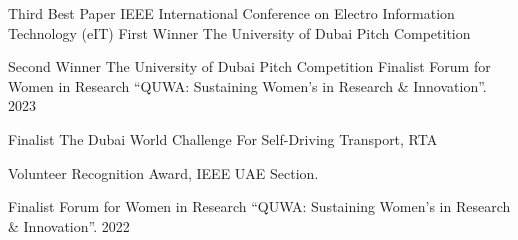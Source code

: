 
\begin{cvhonors}


  \cvhonor
    {Third Best Paper} %
    {IEEE International Conference on Electro Information Technology (eIT)} %
    {} %
    {} %
    \cvhonor
    {First Winner} %
    {The University of Dubai Pitch Competition} %
    {} %
    {} %

    \cvhonor
      {Second Winner} %
    {The University of Dubai Pitch Competition} %
    {} %
    {} %
  \cvhonor
    {Finalist} %
    {Forum for Women in
Research “QUWA: Sustaining Women’s in Research \& Innovation”. } %
    {} %
    {2023} %

  \cvhonor
    {Finalist} %
    {The Dubai World Challenge For Self-Driving Transport, RTA} %
    {} %
    {} %


     \cvhonor
    {Volunteer Recognition Award,} %
    {IEEE UAE Section. } %
    {} %
    {} %



\end{cvhonors}

\begin{cvhonors}

    \cvhonor
    {Finalist} %
    {Forum for Women in
Research “QUWA: Sustaining Women’s in Research \& Innovation”. } %
    {} %
    {2022} %




\end{cvhonors}

